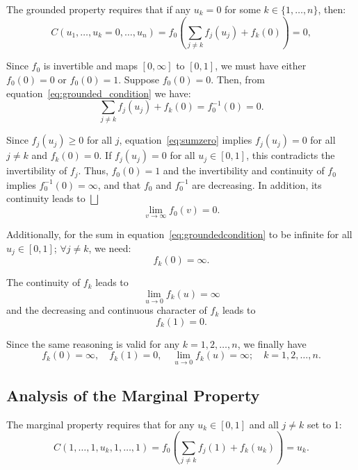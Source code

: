 \documentclass[
	11pt, %
	fleqn, %
	a4paper, %
]{LegrandOrangeBook}
\begin{document}
The grounded property requires that if any $u_k = 0$ for some $k \in \{1,\ldots,n\}$, then:
\begin{equation}
C(u_1,\ldots,u_k = 0,\ldots,u_n) = f_0\left(\sum_{j \neq k} f_j(u_j) + f_k(0)\right) = 0,
\label{eq:groundedcondition}
\end{equation}

Since $f_0$ is invertible and maps $[0,\infty]$ to $[0,1]$, we must have either $f_0(0) = 0$ or $f_0(0) = 1$. Suppose $f_0(0) = 0$. Then, from equation~\eqref{eq:grounded_condition} we have:
\begin{equation}
\sum_{j \neq k} f_j(u_j) + f_k(0) = f_0^{-1}(0) = 0.
\label{eq:sumzero}
\end{equation}

Since $f_j(u_j) \geq 0$ for all $j$, equation~\eqref{eq:sumzero} implies $f_j(u_j) = 0$ for all $j \neq k$ and $f_k(0) = 0$. If $f_j(u_j) = 0$ for all $u_j \in [0,1]$, this contradicts the invertibility of $f_j$. Thus, $f_0(0) = 1$ and the invertibility and continuity of $f_0$ implies $f_0^{-1}(0) = \infty$, and that $f_0$ and $f_0^{-1}$ are decreasing. In addition, its continuity leads to $\bigsqcup$
\begin{equation}
\lim_{v \to \infty} f_0(v) = 0.
\label{eq:limitf0}
\end{equation}

Additionally, for the sum in equation~\eqref{eq:groundedcondition} to be infinite for all $u_j \in [0,1]$; $\forall j \neq k$, we need:
\begin{equation}
f_k(0) = \infty.
\label{eq:fkzeroinfinity}
\end{equation}

The continuity of $f_k$ leads to
\begin{equation}
\lim_{u \to 0} f_k(u) = \infty
\label{eq:limitfkzero}
\end{equation}
and the decreasing and continuous character of $f_k$ leads to
\begin{equation}
f_k(1) = 0.
\label{eq:fkonezero}
\end{equation}

Since the same reasoning is valid for any $k = 1,2,\ldots,n$, we finally have
\begin{equation}
f_k(0) = \infty, \quad f_k(1) = 0, \quad \lim_{u \to 0} f_k(u) = \infty; \quad k = 1,2,\ldots,n.
\label{eq:boundaryconditions}
\end{equation}

\subsection{Analysis of the Marginal Property}
The marginal property requires that for any $u_k \in [0,1]$ and all $j \neq k$ set to 1:
\begin{equation}
C(1,\ldots,1,u_k,1,\ldots,1) = f_0\left(\sum_{j \neq k} f_j(1) + f_k(u_k)\right) = u_k.
\label{eq:marginalcondition}
\end{equation}
\end{document}
